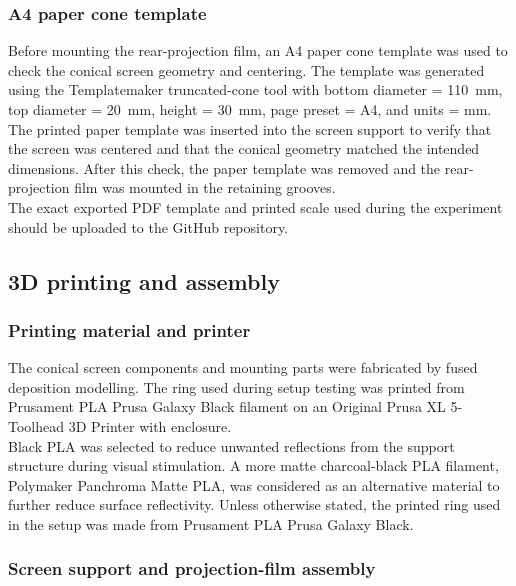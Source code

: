 \subsubsection{A4 paper cone template}

Before mounting the rear-projection film, an A4 paper cone template was used to check the conical screen geometry and centering. The template was generated using the Templatemaker truncated-cone tool with bottom diameter = 110~mm, top diameter = 20~mm, height = 30~mm, page preset = A4, and units = mm.\\

The printed paper template was inserted into the screen support to verify that the screen was centered and that the conical geometry matched the intended dimensions. After this check, the paper template was removed and the rear-projection film was mounted in the retaining grooves.\\

The exact exported PDF template and printed scale used during the experiment should be uploaded to the GitHub repository.\\

\subsection{3D printing and assembly}

\subsubsection{Printing material and printer}

The conical screen components and mounting parts were fabricated by fused deposition modelling. The ring used during setup testing was printed from Prusament PLA Prusa Galaxy Black filament on an Original Prusa XL 5-Toolhead 3D Printer with enclosure.\\

Black PLA was selected to reduce unwanted reflections from the support structure during visual stimulation. A more matte charcoal-black PLA filament, Polymaker Panchroma Matte PLA, was considered as an alternative material to further reduce surface reflectivity. Unless otherwise stated, the printed ring used in the setup was made from Prusament PLA Prusa Galaxy Black.\\

\subsubsection{Screen support and projection-film assembly}


